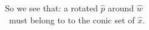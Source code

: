 \documentclass[preview]{standalone}
\begin{document}
\begin{center}
So we see that: a rotated $\hat p$ around $\hat w$ \\ \
                      must belong to to the conic set of $\hat x$.
\end{center}
\end{document}
